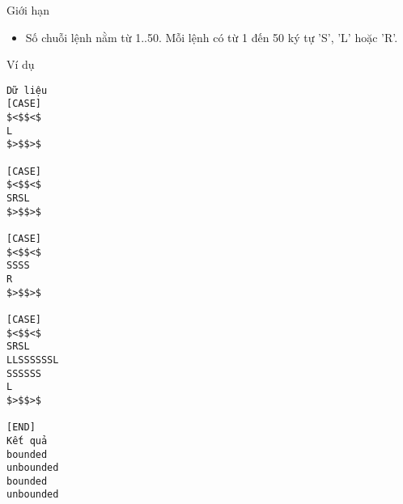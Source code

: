 Giới hạn
\begin{itemize}
	\item     Số chuỗi lệnh nằm từ 1..50. Mỗi lệnh có từ 1 đến 50 ký tự 'S', 'L' hoặc 'R'.   
\end{itemize}
Ví dụ
\begin{verbatim}
Dữ liệu
[CASE]
$<$$<$
L
$>$$>$

[CASE]
$<$$<$
SRSL
$>$$>$

[CASE]
$<$$<$
SSSS
R
$>$$>$

[CASE]
$<$$<$
SRSL
LLSSSSSSL
SSSSSS
L
$>$$>$

[END]
Kết quả
bounded
unbounded
bounded
unbounded
\end{verbatim}